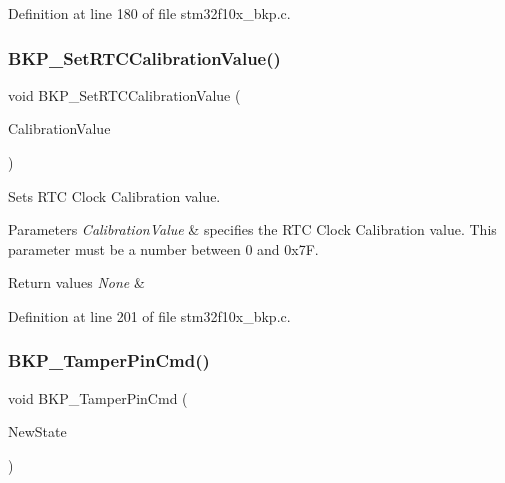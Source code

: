 Definition at line 180 of file stm32f10x\+\_\+bkp.\+c.

\mbox{\label{group___b_k_p___exported___functions_gad34db08a944450d2e7d56d0fd8db2bca}} 
\subsubsection{\texorpdfstring{B\+K\+P\+\_\+\+Set\+R\+T\+C\+Calibration\+Value()}{BKP\_SetRTCCalibrationValue()}}
{\footnotesize\ttfamily void B\+K\+P\+\_\+\+Set\+R\+T\+C\+Calibration\+Value (\begin{DoxyParamCaption}\item[{uint8\+\_\+t}]{Calibration\+Value }\end{DoxyParamCaption})}



Sets R\+TC Clock Calibration value. 


\begin{DoxyParams}{Parameters}
{\em Calibration\+Value} & specifies the R\+TC Clock Calibration value. This parameter must be a number between 0 and 0x7F. \\
\hline
\end{DoxyParams}

\begin{DoxyRetVals}{Return values}
{\em None} & \\
\hline
\end{DoxyRetVals}


Definition at line 201 of file stm32f10x\+\_\+bkp.\+c.

\mbox{\label{group___b_k_p___exported___functions_ga3a0cdff9ad8238ade2c67e2b70f530ac}} 
\subsubsection{\texorpdfstring{B\+K\+P\+\_\+\+Tamper\+Pin\+Cmd()}{BKP\_TamperPinCmd()}}
{\footnotesize\ttfamily void B\+K\+P\+\_\+\+Tamper\+Pin\+Cmd (\begin{DoxyParamCaption}\item[{\hyperlink{group___exported__types_gac9a7e9a35d2513ec15c3b537aaa4fba1}{Functional\+State}}]{New\+State }\end{DoxyParamCaption})}



